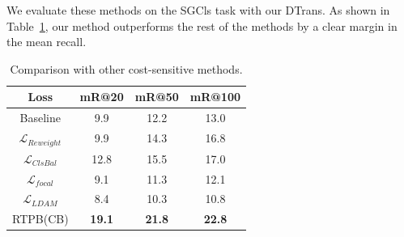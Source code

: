 We evaluate these methods on the SGCls task with our DTrans. As shown in Table~\ref{tab:debias}, our method outperforms the rest of the methods by a clear margin in the mean recall.
\begin{table}
\centering
	\begin{tabular}{c|ccc}
\hline
 Loss & mR@20         & mR@50         & mR@100        \\ \hline
Baseline                                            & 9.9           & 12.2          & 13.0          \\
$\mathcal{L}_{Reweight}$                            & 9.9           & 14.3          & 16.8          \\
$\mathcal{L}_{ClsBal}$                              & 12.8          & 15.5          & 17.0          \\
$\mathcal{L}_{focal}$                               & 9.1           & 11.3          & 12.1          \\
$\mathcal{L}_{LDAM}$                                & 8.4           & 10.3          & 10.8          \\
RTPB(CB)                                            & \textbf{19.1} & \textbf{21.8} & \textbf{22.8} \\ \hline
\end{tabular}
	\caption{Comparison with other cost-sensitive methods.}
	\label{tab:debias}
\end{table}




